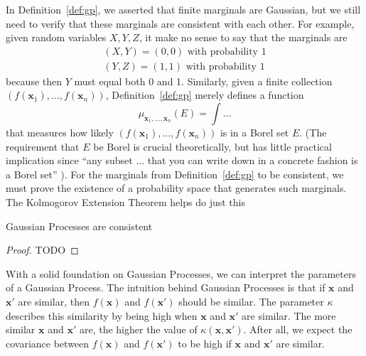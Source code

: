 In Definition~\ref{def:gp}, we asserted that finite marginals are Gaussian, but we still need to verify that these marginals are consistent with each other.
For example, given random variables $X, Y, Z$, it make no sense to say that the marginals are
\begin{align*}
    (X, Y) = (0, 0) \text{ with probability 1} \\
    (Y, Z) = (1, 1) \text{ with probability 1}
\end{align*}
because then $Y$ must equal both 0 and 1.
Similarly, given a finite collection $(f(\mathbf{x}_1), \ldots, f(\mathbf{x}_n))$, Definition~\ref{def:gp} merely defines a function
\begin{equation*}
    \mu_{\mathbf{x}_1, \ldots, \mathbf{x}_n}(E) = \int \ldots
\end{equation*}
that measures how likely $(f(\mathbf{x}_1), \ldots, f(\mathbf{x}_n))$ is in a Borel set $E$.
(The requirement that $E$ be Borel is crucial theoretically, but has little practical implication since
``any subset ... that you can write down in a concrete fashion is a Borel set'' \cite{axler2020}).
For the marginals from Definition~\ref{def:gp} to be consistent, 
we must prove the existence of a probability space that generates such marginals.
The Kolmogorov Extension Theorem helps do just this

\begin{theorem}\label{thm:kol-ext}
    
\end{theorem}

\begin{theorem}\label{thm:gp-const}
    Gaussian Processes are consistent
\end{theorem}
\begin{proof}
    TODO
\end{proof}

With a solid foundation on Gaussian Processes, we can interpret the parameters of a Gaussian Process.
The intuition behind Gaussian Processes is that if $\mathbf{x}$ and $\mathbf{x}'$ are similar, then
$f(\mathbf{x})$ and $f(\mathbf{x}')$ should be similar.
The parameter $\kappa$ describes this similarity by being high when $\mathbf{x}$ and $\mathbf{x}'$ are similar.
The more similar $\mathbf{x}$ and $\mathbf{x}'$ are, the higher the value of $\kappa(\mathbf{x}, \mathbf{x}')$.
After all, we expect the covariance between $f(\mathbf{x})$ and $f(\mathbf{x}')$
to be high if $\mathbf{x}$ and $\mathbf{x}'$ are similar.

